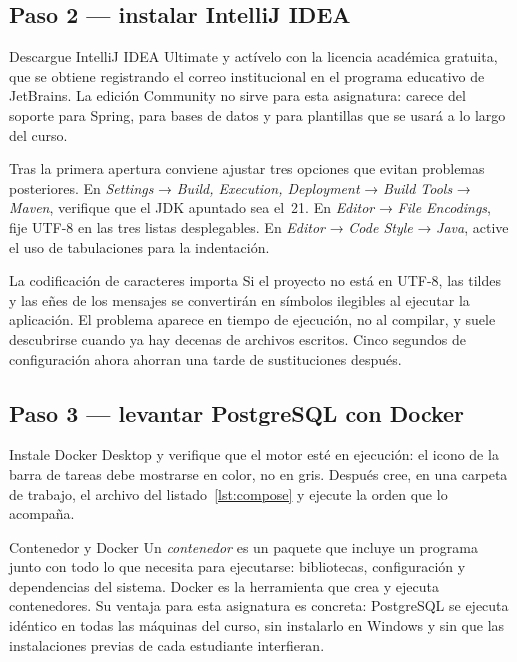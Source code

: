 \documentclass[11pt,a4paper,openany]{book}
\begin{document}
\subsection{Paso 2 --- instalar IntelliJ IDEA}
\label{sec:paso-idea}

Descargue IntelliJ IDEA Ultimate y actívelo con la licencia académica gratuita, que se obtiene registrando el correo institucional en el programa educativo de JetBrains. La edición Community no sirve para esta asignatura: carece del soporte para Spring, para bases de datos y para plantillas que se usará a lo largo del curso.

Tras la primera apertura conviene ajustar tres opciones que evitan problemas posteriores. En \emph{Settings} → \emph{Build, Execution, Deployment} → \emph{Build Tools} → \emph{Maven}, verifique que el JDK apuntado sea el~21. En \emph{Editor} → \emph{File Encodings}, fije UTF-8 en las tres listas desplegables. En \emph{Editor} → \emph{Code Style} → \emph{Java}, active el uso de tabulaciones para la indentación.

\begin{cajaadvertencia}{La codificación de caracteres importa}
	Si el proyecto no está en UTF-8, las tildes y las eñes de los mensajes se convertirán en símbolos ilegibles al ejecutar la aplicación. El problema aparece en tiempo de ejecución, no al compilar, y suele descubrirse cuando ya hay decenas de archivos escritos. Cinco segundos de configuración ahora ahorran una tarde de sustituciones después.
\end{cajaadvertencia}

\subsection{Paso 3 --- levantar PostgreSQL con Docker}
\label{sec:paso-postgres}

Instale Docker Desktop y verifique que el motor esté en ejecución: el icono de la barra de tareas debe mostrarse en color, no en gris. Después cree, en una carpeta de trabajo, el archivo del listado~\ref{lst:compose} y ejecute la orden que lo acompaña.

\begin{cajadefinicion}{Contenedor y Docker}
	Un \emph{contenedor} es un paquete que incluye un programa junto con todo lo que necesita para ejecutarse: bibliotecas, configuración y dependencias del sistema. Docker es la herramienta que crea y ejecuta contenedores. Su ventaja para esta asignatura es concreta: PostgreSQL se ejecuta idéntico en todas las máquinas del curso, sin instalarlo en Windows y sin que las instalaciones previas de cada estudiante interfieran.
\end{cajadefinicion}
\end{document}
